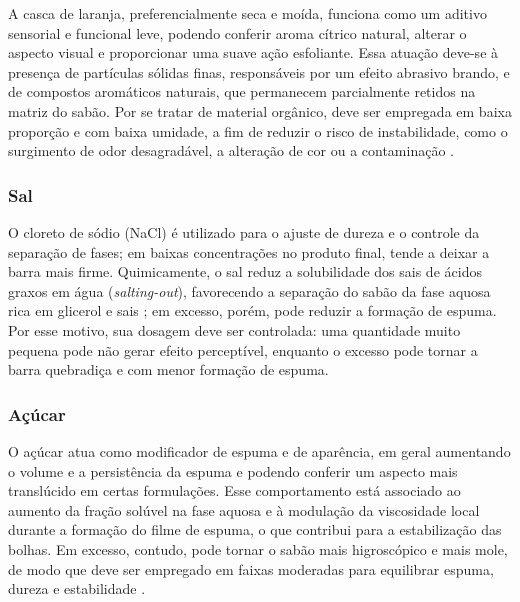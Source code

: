 A casca de laranja, preferencialmente seca e moída, funciona como um aditivo sensorial e funcional leve, podendo conferir aroma cítrico natural, alterar o aspecto visual e proporcionar uma suave ação esfoliante. Essa atuação deve-se à presença de partículas sólidas finas, responsáveis por um efeito abrasivo brando, e de compostos aromáticos naturais, que permanecem parcialmente retidos na matriz do sabão. Por se tratar de material orgânico, deve ser empregada em baixa proporção e com baixa umidade, a fim de reduzir o risco de instabilidade, como o surgimento de odor desagradável, a alteração de cor ou a contaminação \cite{vasave2025herbal}.

\subsubsection{Sal}

O cloreto de sódio (NaCl) é utilizado para o ajuste de dureza e o controle da separação de fases; em baixas concentrações no produto final, tende a deixar a barra mais firme. Quimicamente, o sal reduz a solubilidade dos sais de ácidos graxos em água (\textit{salting-out}), favorecendo a separação do sabão da fase aquosa rica em glicerol e sais \cite{shreve1984chemical}; em excesso, porém, pode reduzir a formação de espuma. Por esse motivo, sua dosagem deve ser controlada: uma quantidade muito pequena pode não gerar efeito perceptível, enquanto o excesso pode tornar a barra quebradiça e com menor formação de espuma.

\subsubsection{Açúcar}

O açúcar atua como modificador de espuma e de aparência, em geral aumentando o volume e a persistência da espuma e podendo conferir um aspecto mais translúcido em certas formulações. Esse comportamento está associado ao aumento da fração solúvel na fase aquosa e à modulação da viscosidade local durante a formação do filme de espuma, o que contribui para a estabilização das bolhas. Em excesso, contudo, pode tornar o sabão mais higroscópico e mais mole, de modo que deve ser empregado em faixas moderadas para equilibrar espuma, dureza e estabilidade \cite{mabrouk2005soap}.
